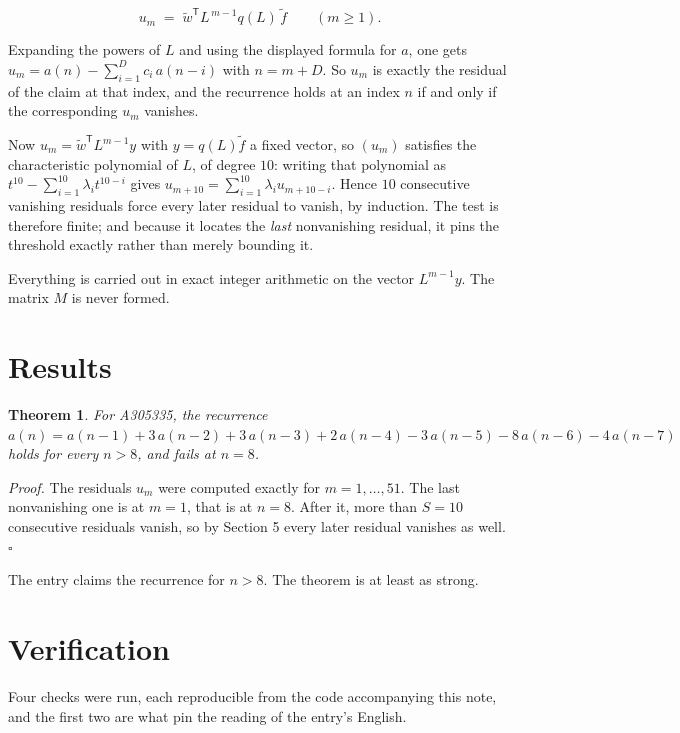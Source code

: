 \documentclass[11pt]{article}
\newtheorem{theorem}{Theorem}
\theoremstyle{definition}
\begin{document}
\[u_m \;=\; \tilde w^{\mathsf T} L^{\,m-1} q(L)\,\tilde f \qquad (m \ge 1).\]

Expanding the powers of $L$ and using the displayed formula for $a$, one gets $u_m = a(n) - \sum_{i=1}^{D} c_i\,a(n-i)$ with $n = m + D$. So $u_m$ is exactly the residual of the claim at that index, and the recurrence holds at an index $n$ if and only if the corresponding $u_m$ vanishes.

Now $u_m = \tilde w^{\mathsf T} L^{m-1} y$ with $y = q(L)\tilde f$ a fixed vector, so $(u_m)$ satisfies the characteristic polynomial of $L$, of degree $10$: writing that polynomial as $t^{10} - \sum_{i=1}^{10} \lambda_i t^{10-i}$ gives $u_{m+10} = \sum_{i=1}^{10} \lambda_i u_{m+10-i}$. Hence $10$ consecutive vanishing residuals force every later residual to vanish, by induction. The test is therefore finite; and because it locates the {\itshape last} nonvanishing residual, it pins the threshold exactly rather than merely bounding it.

Everything is carried out in exact integer arithmetic on the vector $L^{m-1}y$. The matrix $M$ is never formed.

\section{Results}

\begin{theorem} For A305335, the recurrence $a(n) = a(n-1) + 3\,a(n-2) + 3\,a(n-3) + 2\,a(n-4) - 3\,a(n-5) - 8\,a(n-6) - 4\,a(n-7)$ holds for every $n > 8$, and fails at $n = 8$.\end{theorem}

{\itshape Proof.} The residuals $u_m$ were computed exactly for $m = 1,\dots,51$. The last nonvanishing one is at $m = 1$, that is at $n = 8$. After it, more than $S = 10$ consecutive residuals vanish, so by Section 5 every later residual vanishes as well. $\square$

The entry claims the recurrence for $n > 8$. The theorem is at least as strong.

\section{Verification}

Four checks were run, each reproducible from the code accompanying this note, and the first two are what pin the reading of the entry's English.
\end{document}
